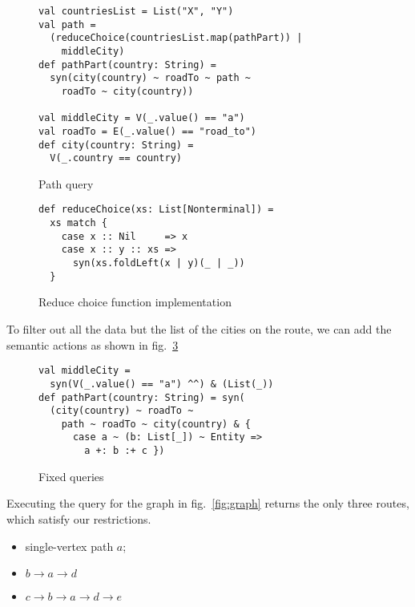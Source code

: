\begin{figure}[h]
\begin{lstlisting}
val countriesList = List("X", "Y")
val path =
  (reduceChoice(countriesList.map(pathPart)) |
    middleCity)
def pathPart(country: String) =
  syn(city(country) ~ roadTo ~ path ~
    roadTo ~ city(country))

val middleCity = V(_.value() == "a")
val roadTo = E(_.value() == "road_to")
def city(country: String) =
  V(_.country == country)
\end{lstlisting}
\caption{Path query}
\label{fig:pathQuery}
\end{figure}

\begin{figure}[h]
\begin{lstlisting}
def reduceChoice(xs: List[Nonterminal]) =
  xs match {
    case x :: Nil     => x
    case x :: y :: xs =>
      syn(xs.foldLeft(x | y)(_ | _))
  }
\end{lstlisting}
\caption{Reduce choice function implementation}
\label{fig:reduceChoice}
\end{figure}

To filter out all the data but the list of the cities on the route, we can add the semantic actions as shown in fig.~\ref{fig:fixedPathQ}


\begin{figure}[h]
\begin{lstlisting}
val middleCity =
  syn(V(_.value() == "a") ^^) & (List(_))
def pathPart(country: String) = syn(
  (city(country) ~ roadTo ~
    path ~ roadTo ~ city(country) & {
      case a ~ (b: List[_]) ~ Entity =>
        a +: b :+ c })
\end{lstlisting}
\caption{Fixed queries}
\label{fig:fixedPathQ}
\end{figure}

Executing the query for the graph in fig.~\ref{fig:graph} returns the only three routes, which satisfy our restrictions. 

\begin{itemize}
\item single-vertex path $a$;
\item $b \rightarrow a \rightarrow d$
\item $c \rightarrow b \rightarrow a \rightarrow d \rightarrow e$
\end{itemize}

